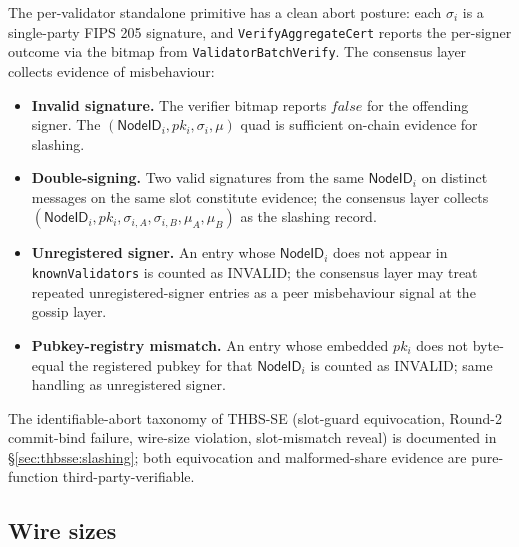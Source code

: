 The per-validator standalone primitive has a clean abort posture:
each $\sigma_i$ is a single-party FIPS 205 signature, and
\texttt{VerifyAggregateCert} reports the per-signer outcome via
the bitmap from \texttt{ValidatorBatchVerify}. The consensus layer
collects evidence of misbehaviour:
\begin{itemize}[leftmargin=2em,nosep]
  \item \textbf{Invalid signature.} The verifier bitmap reports
        $\mathit{false}$ for the offending signer. The
        $(\mathsf{NodeID}_i, pk_i, \sigma_i, \mu)$ quad is
        sufficient on-chain evidence for slashing.
  \item \textbf{Double-signing.} Two valid signatures from the
        same $\mathsf{NodeID}_i$ on distinct messages on the same
        slot constitute evidence; the consensus layer collects
        $(\mathsf{NodeID}_i, pk_i, \sigma_{i,A}, \sigma_{i,B},
        \mu_A, \mu_B)$ as the slashing record.
  \item \textbf{Unregistered signer.} An entry whose
        $\mathsf{NodeID}_i$ does not appear in
        \texttt{knownValidators} is counted as INVALID; the
        consensus layer may treat repeated unregistered-signer
        entries as a peer misbehaviour signal at the gossip layer.
  \item \textbf{Pubkey-registry mismatch.} An entry whose embedded
        $pk_i$ does not byte-equal the registered pubkey for that
        $\mathsf{NodeID}_i$ is counted as INVALID; same handling
        as unregistered signer.
\end{itemize}
The identifiable-abort taxonomy of THBS-SE (slot-guard
equivocation, Round-2 commit-bind failure, wire-size violation,
slot-mismatch reveal) is documented in
\S\ref{sec:thbsse:slashing}; both equivocation and malformed-share
evidence are pure-function third-party-verifiable.

\subsection{Wire sizes}
\label{sec:construction:wire-sizes}


